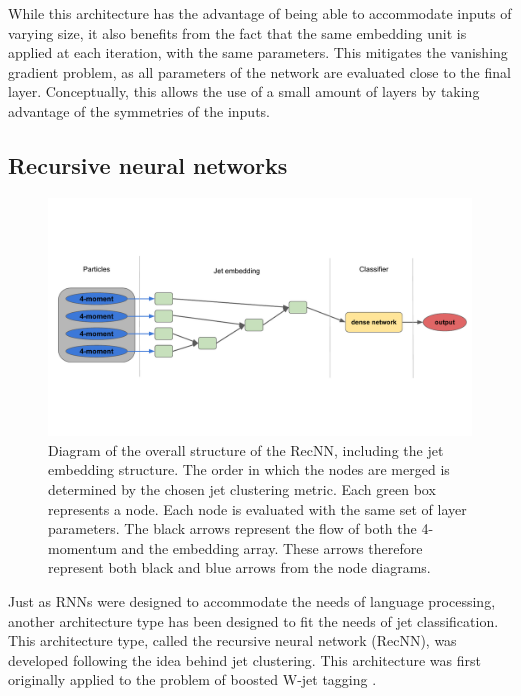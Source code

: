 While this architecture has the advantage of being able to accommodate inputs of varying size, it also benefits from the fact that the same embedding unit is applied at each iteration, with the same parameters. This mitigates the vanishing gradient problem, as all parameters of the network are evaluated close to the final layer. Conceptually, this allows the use of a small amount of layers by taking advantage of the symmetries of the inputs. 

\subsection{Recursive neural networks}
\label{sec:RecNN}


\begin{figure}
    \centering
    \includegraphics[width=\textwidth]{Images/RecNN_diagram.pdf}
    \caption{Diagram of the overall structure of the RecNN, including the jet embedding structure. The order in which the nodes are merged is determined by the chosen jet clustering metric. Each green box represents a node. Each node is evaluated with the same set of layer parameters. The black arrows represent the flow of both the 4-momentum and the embedding array. These arrows therefore represent both black and blue arrows from the node diagrams.}
    \label{fig:recursive_network}
\end{figure}

Just as RNNs were designed to accommodate the needs of language processing, another architecture type has been designed to fit the needs of jet classification. This architecture type, called the recursive neural network (RecNN), was developed following the idea behind jet clustering. This architecture was first originally applied to the problem of boosted W-jet tagging \cite{Louppe:2017ipp}.

